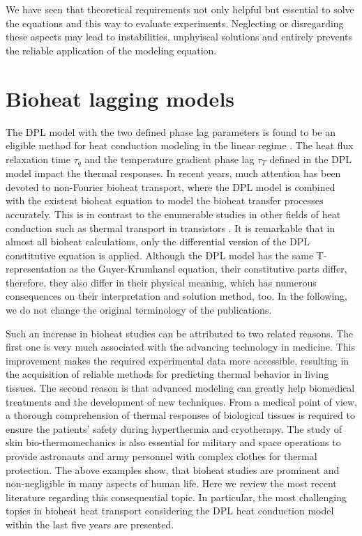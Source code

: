 \documentclass[sn-mathphys]{sn-jnl}%
\theoremstyle{thmstyleone}%
\theoremstyle{thmstyletwo}%
\theoremstyle{thmstylethree}%
\begin{document}
{We have seen that theoretical requirements not only helpful but essential to solve the equations and this way to evaluate experiments. Neglecting or disregarding these aspects may lead to instabilities, unphyiscal solutions and entirely prevents the reliable application of the modeling equation. 


\section{Bioheat lagging models}
\label{bio}

The DPL model with the two defined phase lag parameters is found to be an eligible method for heat conduction modeling in the linear regime \cite{Tzo95a,Tzo97b}. The heat flux relaxation time $\tau_q$ and the temperature gradient phase lag $\tau_T$ defined in the DPL model impact the thermal responses. In recent years, much attention has been devoted to non-Fourier bioheat transport, where the DPL model is combined with the existent bioheat equation to model the bioheat transfer processes accurately. This is in contrast to the enumerable studies in other fields of heat conduction such as thermal transport in transistors \cite{Ghazanfarian2009,Shomali2012,Samian2013,Samian2014,Moghaddam2014,Shomali2014,Shomali20152,Shomali2016,Shomali2017,Shomali2018}. { It is remarkable that in almost all bioheat calculations, only the differential version of the DPL constitutive equation is applied. Although the DPL model has the same T-representation as the Guyer-Krumhansl equation, their constitutive parts differ, therefore, they also differ in their physical meaning, which has numerous consequences on their interpretation and solution method, too.
In the following, we do not change the original terminology of the publications.}

Such an increase in bioheat studies can be attributed to two related reasons. The first one is very much associated with the advancing technology in medicine. This improvement makes the required experimental data more accessible, resulting in the acquisition of reliable methods for predicting thermal behavior in living tissues. The second reason is that advanced modeling can greatly help biomedical treatments and the development of new techniques. From a medical point of view, a thorough comprehension of thermal responses of biological tissues is required to ensure the patients' safety during hyperthermia and cryotherapy. The study of skin bio-thermomechanics is also essential for military and space operations to provide astronauts and army personnel with complex clothes for thermal protection. { The above examples show, that  bioheat studies are prominent and non-negligible in many aspects of human life. Here we review the most recent literature regarding this consequential topic. }In particular, the most challenging topics in bioheat heat transport considering the DPL heat conduction model within the last five years are presented.


}
\end{document}
